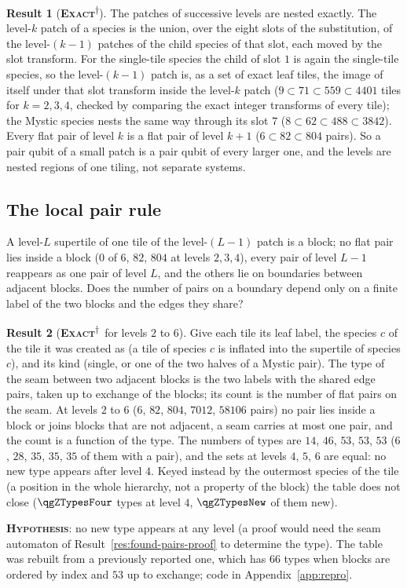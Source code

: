 \documentclass[11pt]{article}
\newcommand{\exact}{\textbf{\textsc{Exact}}}
\newcommand{\hypo}{\textbf{\textsc{Hypothesis}}}
\newcommand{\snap}{\textsuperscript{$\dagger$}}      %
\theoremstyle{definition}
\newtheorem{result}{Result}
\begin{document}
\begin{result}[\exact\snap]\label{res:nesting}
The patches of successive levels are nested exactly. The level-$k$ patch of a species is the union, over the eight slots of the substitution, of the level-$(k{-}1)$ patches of the child species of that slot, each moved by the slot transform. For the single-tile species the child of slot $1$ is again the single-tile species, so the level-$(k{-}1)$ patch is, as a set of exact leaf tiles, the image of itself under that slot transform inside the level-$k$ patch ($9\subset71\subset559\subset4401$ tiles for $k=2,3,4$, checked by comparing the exact integer transforms of every tile); the Mystic species nests the same way through its slot $7$ ($8\subset62\subset488\subset3842$). Every flat pair of level $k$ is a flat pair of level $k+1$ ($6\subset82\subset804$ pairs). So a pair qubit of a small patch is a pair qubit of every larger one, and the levels are nested regions of one tiling, not separate systems.
\end{result}

\subsection{The local pair rule}\label{sec:rule}
A level-$L$ supertile of one tile of the level-$(L{-}1)$ patch is a block; no flat pair lies inside a block ($0$ of $6$, $82$, $804$ at levels $2,3,4$), every pair of level $L-1$ reappears as one pair of level $L$, and the others lie on boundaries between adjacent blocks. Does the number of pairs on a boundary depend only on a finite label of the two blocks and the edges they share?
\begin{result}[\exact\snap\ for levels $2$ to $6$]\label{res:ham-rg-closed}
Give each tile its leaf label, the species $c$ of the tile it was created as (a tile of species $c$ is inflated into the supertile of species $c$), and its kind (single, or one of the two halves of a Mystic pair). The type of the seam between two adjacent blocks is the two labels with the shared edge pairs, taken up to exchange of the blocks; its count is the number of flat pairs on the seam. At levels $2$ to $6$ ($6$, $82$, $804$, $7012$, $58106$ pairs) no pair lies inside a block or joins blocks that are not adjacent, a seam carries at most one pair, and the count is a function of the type. The numbers of types are $14$, $46$, $53$, $53$, $53$ ($6$, $28$, $35$, $35$, $35$ of them with a pair), and the sets at levels $4$, $5$, $6$ are equal: no new type appears after level $4$. Keyed instead by the outermost species of the tile (a position in the whole hierarchy, not a property of the block) the table does not close ($\qgZTypesFour$ types at level $4$, $\qgZTypesNew$ of them new).
\end{result}
\hypo: no new type appears at any level (a proof would need the seam automaton of Result~\ref{res:found-pairs-proof} to determine the type). The table was rebuilt from a previously reported one, which has $66$ types when blocks are ordered by index and $53$ up to exchange; code in Appendix~\ref{app:repro}.
\end{document}
